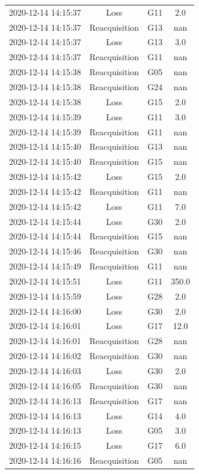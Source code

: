 \begin{enumerate}
\begin{longtabu}{cccc}
2020{-}12{-}14 14:15:37&Loss&G11&2.0\\%
2020{-}12{-}14 14:15:37&Reacquisition&G13&nan\\%
2020{-}12{-}14 14:15:37&Loss&G13&3.0\\%
2020{-}12{-}14 14:15:37&Reacquisition&G11&nan\\%
2020{-}12{-}14 14:15:38&Reacquisition&G05&nan\\%
2020{-}12{-}14 14:15:38&Reacquisition&G24&nan\\%
2020{-}12{-}14 14:15:38&Loss&G15&2.0\\%
2020{-}12{-}14 14:15:39&Loss&G11&3.0\\%
2020{-}12{-}14 14:15:39&Reacquisition&G11&nan\\%
2020{-}12{-}14 14:15:40&Reacquisition&G13&nan\\%
2020{-}12{-}14 14:15:40&Reacquisition&G15&nan\\%
2020{-}12{-}14 14:15:42&Loss&G15&2.0\\%
2020{-}12{-}14 14:15:42&Reacquisition&G11&nan\\%
2020{-}12{-}14 14:15:42&Loss&G11&7.0\\%
2020{-}12{-}14 14:15:44&Loss&G30&2.0\\%
2020{-}12{-}14 14:15:44&Reacquisition&G15&nan\\%
2020{-}12{-}14 14:15:46&Reacquisition&G30&nan\\%
2020{-}12{-}14 14:15:49&Reacquisition&G11&nan\\%
2020{-}12{-}14 14:15:51&Loss&G11&350.0\\%
2020{-}12{-}14 14:15:59&Loss&G28&2.0\\%
2020{-}12{-}14 14:16:00&Loss&G30&2.0\\%
2020{-}12{-}14 14:16:01&Loss&G17&12.0\\%
2020{-}12{-}14 14:16:01&Reacquisition&G28&nan\\%
2020{-}12{-}14 14:16:02&Reacquisition&G30&nan\\%
2020{-}12{-}14 14:16:03&Loss&G30&2.0\\%
2020{-}12{-}14 14:16:05&Reacquisition&G30&nan\\%
2020{-}12{-}14 14:16:13&Reacquisition&G17&nan\\%
2020{-}12{-}14 14:16:13&Loss&G14&4.0\\%
2020{-}12{-}14 14:16:13&Loss&G05&3.0\\%
2020{-}12{-}14 14:16:15&Loss&G17&6.0\\%
2020{-}12{-}14 14:16:16&Reacquisition&G05&nan\\%

\end{longtabu}
\end{enumerate}
